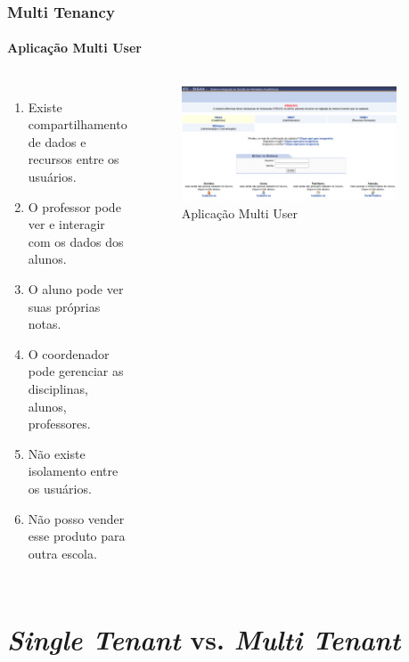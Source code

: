 \documentclass[
	9pt, %
	t, %
]{beamer}
\begin{document}
\begin{frame}
	\frametitle{Multi Tenancy}
	\framesubtitle{Aplicação Multi User}

	\begin{columns}
		\begin{enumerate}
			\item Existe compartilhamento de dados e recursos entre os usuários.
			\item O professor pode ver e interagir com os dados dos alunos.
			\item O aluno pode ver suas próprias notas.
			\item O coordenador pode gerenciar as disciplinas, alunos, professores.
			\item Não existe isolamento entre os usuários.
			\item Não posso vender esse produto para outra escola.
		\end{enumerate}

		\begin{figure}
			\centering
			\includegraphics[width=0.9\textwidth]{sigaa_tela.png}
			\caption{Aplicação Multi User}
		\end{figure}

	\end{columns}

\end{frame}

\section{\textit{Single Tenant} vs. \textit{Multi Tenant}}
\end{document}
